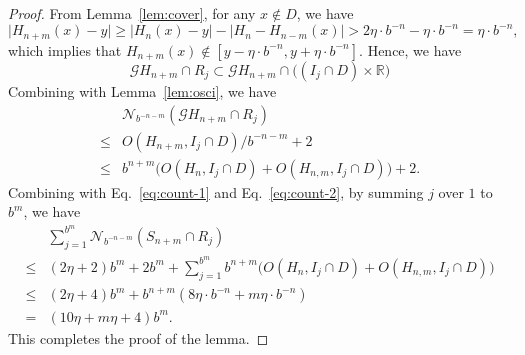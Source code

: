 \documentclass{amsart}
\theoremstyle{definition}
\theoremstyle{remark}
\numberwithin{equation}{section}
\newcommand{\Z}{{\mathbb Z}}
\def\N{\mathcal{N}}
\def\R{\mathbb{R}}
\def\g{\mathcal{G}}
\begin{document}
\begin{proof}

From Lemma~\ref{lem:cover}, for any $ x \notin D$, we have 
$$
	\big| H_{n+m}(x) -y\big|\geq \big| H_{n}(x)-y \big|-\big| H_{n}-H_{n-m}(x) \big| > 2\eta \cdot b^{-n}-\eta \cdot b^{-n}=\eta \cdot b^{-n},
$$
which implies that
$	
	H_{n+m}(x) \notin [y-\eta \cdot b^{-n},y+ \eta \cdot b^{-n}].
$
Hence, we have
$$
	\g H_{n+m} \cap R_j \subset   \g H_{n+m} \cap \big( ( I_j\cap D)\times \R\big)   
$$
Combining with Lemma~\ref{lem:osci}, we have
\begin{align*}
	& \N_{b^{-n-m}}(\g H_{n+m} \cap R_j)  \\
	\leq & O( H_{n+m},I_j\cap D)/b^{-n-m}+2   \\ 
	\leq &b^{n+m} \big( O( H_{n},I_j\cap D)+O( H_{n,m},I_j\cap D)\big)+2  .
\end{align*}
Combining with Eq.~\eqref{eq:count-1} and Eq.~\eqref{eq:count-2}, by
summing $j$ over $1$ to $b^m$, we have
\begin{align*}
 &\sum_{j=1}^{b^m} \N_{b^{-n-m}}(S_{n+m} \cap R_j) \\
  \leq & (2\eta+2)  b^m+2b^m+ \sum_{j=1}^{b^m} b^{n+m}\Big(  O (H_{n}, I_{j} \cap D ) + O(H_{n,m}, I_j \cap D ) \Big) \\
  \leq & (2\eta+4) b^m+  b^{n+m}(  8\eta \cdot b^{-n}+m\eta \cdot b^{-n})\\
  =&(10\eta +m \eta +4  )b^m.
\end{align*}
This completes the proof of the lemma.
\end{proof}
\end{document}
